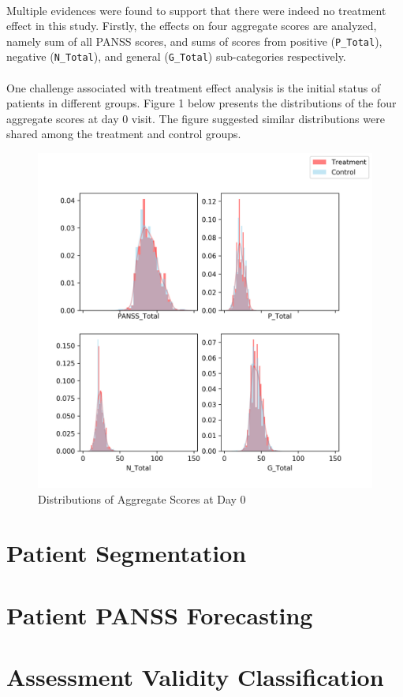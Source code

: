 \documentclass[11pt]{article}
\begin{document}
	\paragraph{}Multiple evidences were found to support that there were indeed no treatment effect in this study. Firstly, the effects on four aggregate scores are analyzed, namely sum of all PANSS scores, and sums of scores from positive (\texttt{P\_Total}), negative (\texttt{N\_Total}), and general (\texttt{G\_Total}) sub-categories respectively.
	
	\paragraph{}One challenge associated with treatment effect analysis is the initial status of patients in different groups.
	Figure 1 below presents the distributions of the four aggregate scores at day 0 visit. 	The figure suggested similar distributions were shared among the treatment and control groups.
	
	\begin{figure}[h]
		\centering
		\includegraphics[width=0.7\linewidth]{figures/dist_initial_scores.png}
		\caption{Distributions of Aggregate Scores at Day 0}
	\end{figure}
	
	\section{Patient Segmentation}
	\section{Patient PANSS Forecasting}
	\section{Assessment Validity Classification}
\end{document}
